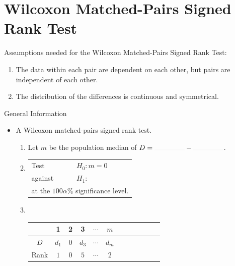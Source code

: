 \documentclass[../Notes.tex]{subfiles}
\begin{document}
\section{Wilcoxon Matched-Pairs Signed Rank Test}
\begin{note}
  Assumptions needed for the Wilcoxon Matched-Pairs Signed Rank Test:
  \begin{enumerate}
    \item The data within each pair are dependent on each other, but pairs are independent of each other.
    \item The distribution of the differences is continuous and symmetrical.
  \end{enumerate}
\end{note}
\begin{stbox}{General Information}
  \begin{itemize}
    \item A Wilcoxon matched-pairs signed rank test. 
    \begin{enumerate}
      \item Let \(m\) be the population median of \(D=\rule{1.5cm}{0.01mm}-\rule{1.5cm}{0.01mm}\).
      \item 
      \begin{tabular}{|ll|}
        \hline
        Test & \(H_0\colon m=0\)\\
        against &\(H_1\colon\) 
        \begin{enumerate*}[itemjoin={\quad}]
          \item \(m<\highlight[yellow]{0}\),
          \item \(m\neq \highlight[yellow]{0}\),\quad or
          \item \(m>\highlight[yellow]{0}\),
        \end{enumerate*}\\
        \multicolumn{2}{|l|}{at the \(100\alpha\%\) significance level.}\\
        \hline
      \end{tabular}
      \item ~
      \begin{table}[H]
        \centering
        \begin{tabular}{|Sc|Sc|Sc|Sc|Sc|Sc|}
           & 1 & 2 & 3 & \(\cdots\) & \(m\)\\
          \hline 
          \(D\) & \(d_1\) & \(0\) & \(d_3\) & \(\cdots\) & \(d_m\)\\
          \hline
          Rank & \(1\) & \(0\) & \(5\) & \(\cdots\) & \(2\)\\

\end{tabular}
\end{table}
\end{enumerate}
\end{itemize}
\end{stbox}
\end{document}
